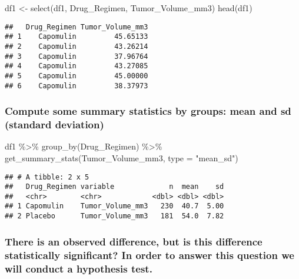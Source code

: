\documentclass[
]{article}
\newenvironment{Shaded}{\begin{snugshade}}{\end{snugshade}}
\newcommand{\AttributeTok}[1]{\textcolor[rgb]{0.77,0.63,0.00}{#1}}
\newcommand{\FunctionTok}[1]{\textcolor[rgb]{0.00,0.00,0.00}{#1}}
\newcommand{\NormalTok}[1]{#1}
\newcommand{\OtherTok}[1]{\textcolor[rgb]{0.56,0.35,0.01}{#1}}
\newcommand{\SpecialCharTok}[1]{\textcolor[rgb]{0.00,0.00,0.00}{#1}}
\newcommand{\StringTok}[1]{\textcolor[rgb]{0.31,0.60,0.02}{#1}}
\begin{document}
\begin{Shaded}
\begin{Highlighting}[]
\NormalTok{df1 }\OtherTok{\textless{}{-}} \FunctionTok{select}\NormalTok{(df1, Drug\_Regimen, Tumor\_Volume\_mm3)}
\FunctionTok{head}\NormalTok{(df1)}
\end{Highlighting}
\end{Shaded}

\begin{verbatim}
##   Drug_Regimen Tumor_Volume_mm3
## 1    Capomulin         45.65133
## 2    Capomulin         43.26214
## 3    Capomulin         37.96764
## 4    Capomulin         43.27085
## 5    Capomulin         45.00000
## 6    Capomulin         38.37973
\end{verbatim}

\hypertarget{compute-some-summary-statistics-by-groups-mean-and-sd-standard-deviation}{%
\subsubsection{Compute some summary statistics by groups: mean and sd
(standard
deviation)}\label{compute-some-summary-statistics-by-groups-mean-and-sd-standard-deviation}}

\begin{Shaded}
\begin{Highlighting}[]
\NormalTok{df1 }\SpecialCharTok{\%\textgreater{}\%}
  \FunctionTok{group\_by}\NormalTok{(Drug\_Regimen) }\SpecialCharTok{\%\textgreater{}\%}
  \FunctionTok{get\_summary\_stats}\NormalTok{(Tumor\_Volume\_mm3, }\AttributeTok{type =} \StringTok{"mean\_sd"}\NormalTok{)}
\end{Highlighting}
\end{Shaded}

\begin{verbatim}
## # A tibble: 2 x 5
##   Drug_Regimen variable             n  mean    sd
##   <chr>        <chr>            <dbl> <dbl> <dbl>
## 1 Capomulin    Tumor_Volume_mm3   230  40.7  5.00
## 2 Placebo      Tumor_Volume_mm3   181  54.0  7.82
\end{verbatim}

\hypertarget{there-is-an-observed-difference-but-is-this-difference-statistically-significant-in-order-to-answer-this-question-we-will-conduct-a-hypothesis-test.}{%
\subsubsection{There is an observed difference, but is this difference
statistically significant? In order to answer this question we will
conduct a hypothesis
test.}\label{there-is-an-observed-difference-but-is-this-difference-statistically-significant-in-order-to-answer-this-question-we-will-conduct-a-hypothesis-test.}}
\end{document}
